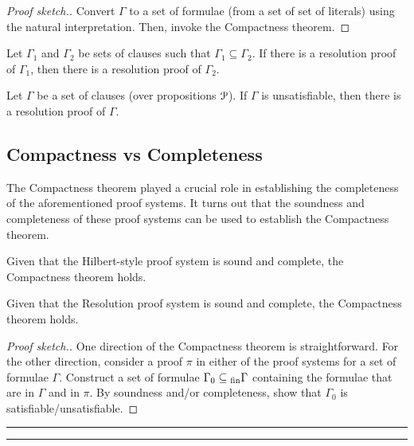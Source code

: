 \documentclass[11pt,usenames, dvipsnames]{article}
\begin{document}
\begin{proof}[Proof sketch.]
  Convert $\Gamma$ to a set of formulae (from a set of set of literals) using the natural interpretation. Then, invoke the Compactness theorem.
\end{proof}

\begin{claim}
  Let $\Gamma_1$ and $\Gamma_2$ be sets of clauses such that $\Gamma_1 \subseteq \Gamma_2$. If there is a resolution proof of $\Gamma_1$, then there is a resolution proof of $\Gamma_2$.
\end{claim}

\begin{theorem}
  Let $\Gamma$ be a set of clauses (over propositions $\props$). If $\Gamma$ is unsatisfiable, then there is a resolution proof of $\Gamma$.
\end{theorem}

\subsection{\large \centering Compactness vs Completeness}

The Compactness theorem played a crucial role in establishing the completeness of the aforementioned proof systems. It turns out that the soundness and completeness of these proof systems can be used to establish the Compactness theorem.

\begin{claim}
  Given that the Hilbert-style proof system is sound and complete, the Compactness theorem holds.
\end{claim}

\begin{claim}
  Given that the Resolution proof system is sound and complete, the Compactness theorem holds.
\end{claim}

\begin{proof}[Proof sketch.]
  One direction of the Compactness theorem is straightforward. For the other direction, consider a proof $\pi$ in either of the proof systems for a set of formulae $\Gamma$. Construct a set of formulae $\Gamma_0 \subseteq\textsubscript{fin} \Gamma$ containing the formulae that are in $\Gamma$ and in $\pi$. By soundness and/or completeness, show that $\Gamma_0$ is satisfiable/unsatisfiable.
\end{proof}

\vspace{5truemm}
\hrule
\hrule
\end{document}
